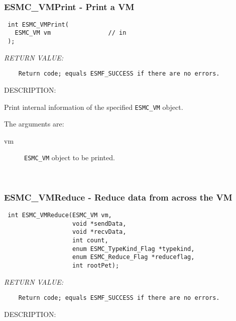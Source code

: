  
\mbox{}\hrulefill\ 
 
\subsubsection [ESMC\_VMPrint] {ESMC\_VMPrint - Print a VM}


  
\begin{verbatim} int ESMC_VMPrint(
   ESMC_VM vm                // in
 );\end{verbatim}{\em RETURN VALUE:}
\begin{verbatim}    Return code; equals ESMF_SUCCESS if there are no errors.\end{verbatim}
{\sf DESCRIPTION:\\ }


  
    Print internal information of the specified {\tt ESMC\_VM} object.
  
    The arguments are:
    \begin{description}
    \item[vm] 
      {\tt ESMC\_VM} object to be printed.
    \end{description}
   
 
\mbox{}\hrulefill\ 
 
\subsubsection [ESMC\_VMReduce] {ESMC\_VMReduce - Reduce data from across the VM}


  
\begin{verbatim} int ESMC_VMReduce(ESMC_VM vm,
                   void *sendData,
                   void *recvData,
                   int count,
                   enum ESMC_TypeKind_Flag *typekind,
                   enum ESMC_Reduce_Flag *reduceflag,
                   int rootPet);\end{verbatim}{\em RETURN VALUE:}
\begin{verbatim}    Return code; equals ESMF_SUCCESS if there are no errors.\end{verbatim}
{\sf DESCRIPTION:\\ }


